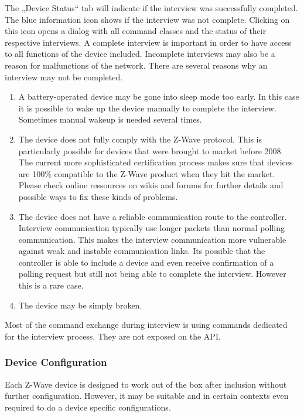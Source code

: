 The „Device Status“ tab will indicate if the interview was successfully completed.  The blue information icon shows if the interview was not complete. Clicking on this icon opens a dialog with all command classes and the status of their respective interviews.  
A complete interview is important in order to have access to all functions of the device included. Incomplete interviews may also be a reason for malfunctions of the network.
There are several reasons why an interview may not be completed.
\begin{enumerate}
\item A battery-operated device may be gone into sleep mode too early. In this case it is possible to wake up the device manually to complete the interview. Sometimes manual wakeup is needed several times.
\item The device does not fully comply with the Z-Wave protocol. This is particularly possible for devices that were brought to market before 2008. 
The current more sophisticated certification process makes sure that devices are 100\% compatible to the Z-Wave product when they hit the market. 
Please check online ressources on wikis and forums for further details and possible ways to fix these kinds of problems.
\item The device does not have a reliable communication route to the controller. Interview communication typically use longer packets than normal polling communication. This makes the interview communication more vulnerable against weak and instable communication links. Its possible that the controller is able to include a device and even receive confirmation of a polling request but still not being able to complete the interview. However this is a rare case.
\item The device may be simply broken.

\end{enumerate}

Most of the command exchange during interview is using commands dedicated for the interview process. They are not exposed on the API.

\subsubsection{Device Configuration} 


Each Z-Wave device is designed to work out of the box after inclusion without further configuration. 
However, it may be suitable and in certain contexts even required to do a device specific configurations.

